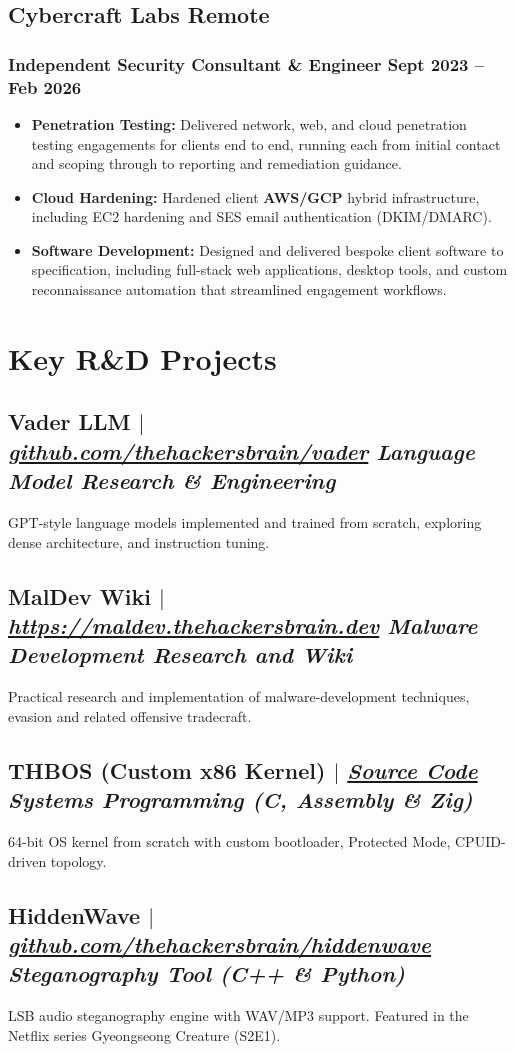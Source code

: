 \documentclass[10pt]{article}
\newcommand{\resumeSubheading}[4]{
    \subsection*{#1 \hfill #2}
    \subsubsection*{#3 \hfill #4}
    \vspace{2pt}
}
\newcommand{\projectSubheading}[4]{
    \subsection*{#1 $|$ \normalfont\textit{\href{#2}{#3}} \hfill #4}
    \vspace{3pt}
}
\begin{document}
\vspace{2pt}

\resumeSubheading
{Cybercraft Labs}{Remote}
{Independent Security Consultant \& Engineer}{Sept 2023 -- Feb 2026}
\begin{itemize}
	\item \textbf{Penetration Testing:} Delivered network, web, and cloud penetration testing engagements for clients end to end, running each from initial contact and scoping through to reporting and remediation guidance.
	\item \textbf{Cloud Hardening:} Hardened client \textbf{AWS/GCP} hybrid infrastructure, including EC2 hardening and SES email authentication (DKIM/DMARC).
	\item \textbf{Software Development:} Designed and delivered bespoke client software to specification, including full-stack web applications, desktop tools, and custom reconnaissance automation that streamlined engagement workflows.
\end{itemize}

\section{Key R\&D Projects}

\projectSubheading
{Vader LLM}{https://github.com/thehackersbrain/vader}{github.com/thehackersbrain/vader}
{\textit{Language Model Research \& Engineering}}
GPT-style language models implemented and trained from scratch, exploring dense architecture, and instruction tuning.
\vspace{2pt}

\projectSubheading
{MalDev Wiki}{https://maldev.thehackersbrain.dev/}{https://maldev.thehackersbrain.dev}
{\textit{Malware Development Research and Wiki}}
Practical research and implementation of malware-development techniques, evasion and related offensive tradecraft.
\vspace{2pt}

\projectSubheading
{THBOS (Custom x86 Kernel)}{https://github.com/thehackersbrain/cpuinfo-os}{Source Code}
{\textit{Systems Programming (C, Assembly \& Zig)}}
64-bit OS kernel from scratch with custom bootloader, Protected Mode, CPUID-driven topology.
\vspace{2pt}

\projectSubheading
{HiddenWave}{https://github.com/thehackersbrain/hiddenwave}{github.com/thehackersbrain/hiddenwave}
{\textit{Steganography Tool (C++ \& Python)}}
LSB audio steganography engine with WAV/MP3 support. Featured in the Netflix series Gyeongseong Creature (S2E1).
\end{document}

